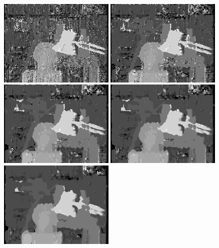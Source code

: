 \documentclass[english, paper=a4]{scrartcl}
\begin{document}
\begin{figure}[H]
\centering
\includegraphics[width=0.49\textwidth]{tsukuba_result_left_winsize3_mindisp15.png}
\label{fig:tsukuba_result_left_winsize3_mindisp15}
\includegraphics[width=0.49\textwidth]{tsukuba_result_left_winsize5_mindisp15.png}
\label{fig:tsukuba_result_left_winsize5_mindisp15}
\includegraphics[width=0.49\textwidth]{tsukuba_result_left_winsize7_mindisp15.png}
\label{fig:tsukuba_result_left_winsize7_mindisp15}
\includegraphics[width=0.49\textwidth]{tsukuba_result_left_winsize9_mindisp15.png}
\label{fig:tsukuba_result_left_winsize9_mindisp15}
\includegraphics[width=0.49\textwidth]{tsukuba_result_left_winsize11_mindisp15.png}

\end{figure}
\end{document}
